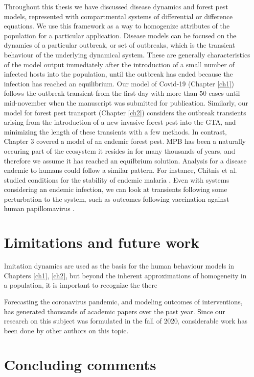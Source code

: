 Throughout this thesis we have discussed disease dynamics and forest pest models, represented with compartmental systems of differential or difference equations. We use this framework as a way to homogenize attributes of the population for a particular application. Disease models can be focused on the dynamics of a particular outbreak, or set of outbreaks, which is the transient behaviour of the underlying dynamical system. These are generally characteristics of the model output immediately after the introduction of a small number of infected hosts into the population, until the outbreak has ended because the infection has reached an equilibrium. Our model of Covid-19 (Chapter \ref{ch1}) follows the outbreak transient from the first day with more than 50 cases until mid-november when the manuscript was submitted for publication. Similarly, our model for forest pest transport (Chapter \ref{ch2}) considers the outbreak transients arising from the introduction of a new invasive forest pest into the GTA, and minimizing the length of these transients with a few methods. In contrast, Chapter 3 covered a model of an endemic forest pest. MPB has been a naturally occuring part of the ecosystem it resides in for many thousands of years, and therefore we assume it has reached an equilbrium solution. Analysis for a disease endemic to humans could follow a similar pattern. For instance, Chitnis et al. studied conditions for the stability of endemic malaria \cite{chitnis2006bifurcation}. Even with systems considering an endemic infection, we can look at transients following some perturbation to the system, such as outcomes following vaccination against human papillomavirus \cite{lee2012mathematical}. 


\section{Limitations and future work}

Imitation dynamics are used as the basis for the human behaviour models in Chapters \ref{ch1}, \ref{ch2}, but beyond the inherent approximations of homogeneity in a population, it is important to recognize the there 



Forecasting the coronavirus pandemic, and modeling outcomes of interventions, has generated thousands of academic papers over the past year. Since our research on this subject was formulated in the fall of 2020, considerable work has been done by other authors on this topic. 






\section{Concluding comments}